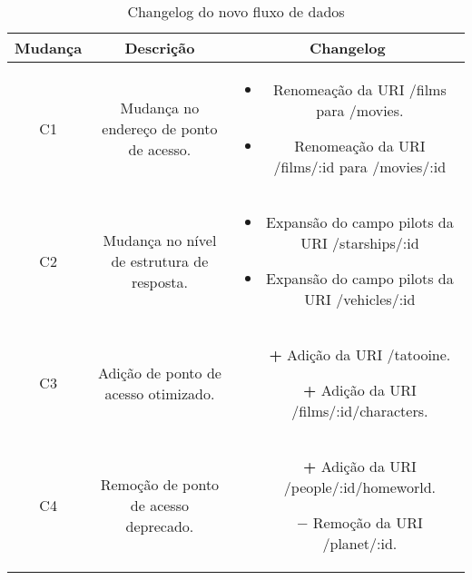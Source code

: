 \begin{table}[H]
  \centering
  \begin{tabular}{|c|c|c|}
    \hline
    Mudança & Descrição & Changelog \\
    \hline
    C1 & \begin{minipage}[t]{0.3\textwidth}
      Mudança no endereço de ponto de acesso.
    \end{minipage} & \begin{minipage}[t]{0.5\textwidth}
      \begin{itemize}
        \item Renomeação da URI /films para /movies.
        \item Renomeação da URI /films/:id para /movies/:id
      \end{itemize}
    \end{minipage} \\
    \hline
    C2 & \begin{minipage}[t]{0.3\textwidth}
      Mudança no nível de estrutura de resposta.
    \end{minipage} & \begin{minipage}[t]{0.5\textwidth}
      \begin{itemize}
        \item Expansão do campo pilots da URI /starships/:id
        \item Expansão do campo pilots da URI /vehicles/:id
      \end{itemize}
    \end{minipage} \\
    \hline
    C3 & \begin{minipage}[t]{0.3\textwidth}
      Adição de ponto de acesso otimizado.
    \end{minipage} & \begin{minipage}[t]{0.5\textwidth}
      \begin{itemize}
        \item[\textbf{+}] Adição da URI /tatooine.
        \item[\textbf{+}] Adição da URI /films/:id/characters.
      \end{itemize}
    \end{minipage} \\
    \hline
    C4 & \begin{minipage}[t]{0.3\textwidth}
      Remoção de ponto de acesso deprecado.
    \end{minipage} & \begin{minipage}[t]{0.5\textwidth}
      \begin{itemize}
        \item[\textbf{+}] Adição da URI /people/:id/homeworld.
        \item[\textbf{$-$}] Remoção da URI /planet/:id.
      \end{itemize}
    \end{minipage} \\
    \hline
  \end{tabular}
  \caption{Changelog do novo fluxo de dados}
\end{table}

